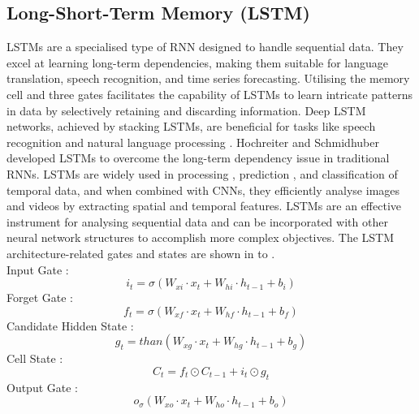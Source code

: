 \subsection{Long-Short-Term Memory (LSTM)}
LSTMs are a specialised type of RNN designed to handle sequential data. They excel at learning long-term dependencies,  making them suitable for language translation,  speech recognition,  and time series forecasting. Utilising the memory cell and three gates facilitates the capability of LSTMs to learn intricate patterns in data by selectively retaining and discarding information. Deep LSTM networks,  achieved by stacking LSTMs,  are beneficial for tasks like speech recognition \cite{soltau2016neural, jo2020approximate} and natural language processing \cite{wang2015learning, nammous2019natural}. Hochreiter and Schmidhuber  \cite{hochreiter1997long} developed LSTMs to overcome the long-term dependency issue in traditional RNNs. LSTMs are widely used in processing \cite{sahin2018nonuniformly},  prediction \cite{gers2000learning},  and classification \cite{zhou2015c, karim2017lstm} of temporal data,  and when combined with CNNs,  they efficiently analyse images \cite{li2019cnn, rajendran2020land, islam2020combined} and videos \cite{ullah2017action, li2020classifying, gao2017video, bin2018describing} by extracting spatial and temporal features. LSTMs are an effective instrument for analysing sequential data and can be incorporated with other neural network structures to accomplish more complex objectives.
The LSTM architecture-related gates and states are shown in  to .\\
Input Gate : 
  \begin{equation} \label{lstm i}
     i_t=\sigma (W_{xi}\cdot x_t+W_{hi}\cdot h_{t-1}+b_i)
  \end{equation}
  Forget Gate : 
  \begin{equation}\label{lstm f}
    f_t= \sigma(W_{xf}\cdot x_t +W_{hf}\cdot h_{t-1}+b_f)
  \end{equation}
  Candidate Hidden State :
  \begin{equation}\label{lstm c}
       g_t=than(W_{xg}\cdot x_t+W_{hg}\cdot h_{t-1} +b_g)
  \end{equation}
  Cell State :
  \begin{equation}\label{lstm ce}
  C_t=f_t \odot C_{t-1}+i_t \odot g_t
  \end{equation}
  Output Gate : 
  \begin{equation}\label{lstm o}
    o_\sigma(W_{xo}\cdot x_t +W_{ho}\cdot h_{t-1}+b_o)
  \end{equation}
